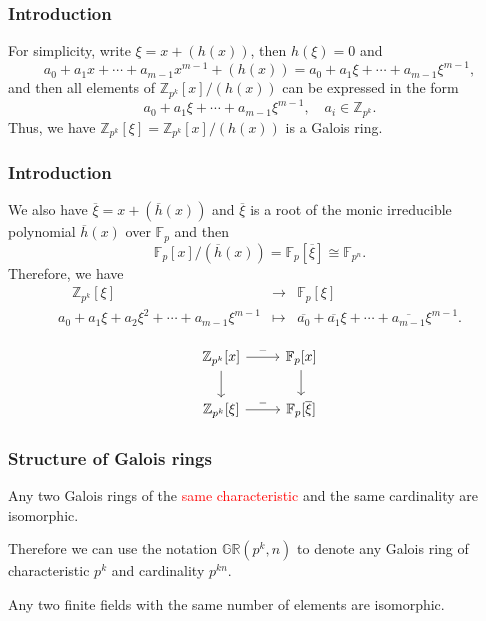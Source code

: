 \documentclass[
    aspectratio=169,                   %
]{beamer}
\newcommand{\Z}{\mathbb{Z}}
\newcommand{\GR}{\mathbb{GR}}
\newcommand{\F}{\mathbb{F}}
\begin{document}
    \begin{frame}
        \frametitle{Introduction}
    
        For simplicity, write $ \xi=x+(h(x)) $, then $ h(\xi)=0 $ and 
        \[a_0+a_1x+\cdots+a_{m-1}x^{m-1}+(h(x))=a_0+a_1\xi+\cdots+a_{m-1}\xi^{m-1},\]
         and then all elements of $ \Z_{p^k}[x]/(h(x)) $ can be expressed in the form
         \[a_0+a_1\xi+\cdots+a_{m-1}\xi^{m-1},\quad a_i\in\Z_{p^k}.\]
        Thus, we have $ \Z_{p^k}[\xi]=\Z_{p^k}[x]/(h(x)) $ is a Galois ring.
    
    \end{frame}

    \begin{frame}[fragile]
        \frametitle{Introduction}
    
        We also have $ \overline{\xi}=x+(\overline{h}(x)) $ and $ \overline{\xi} $ is a root of 
        the monic irreducible polynomial $ \overline{h}(x) $ over $ \F_p $ and then 
        \[\F_p[x]/(\overline{h}(x))=\F_p[\overline{\xi}]\cong \F_{p^n}.\]
        Therefore, we have 
        \[\begin{array}{ccc}
            \quad\Z_{p^k}[\xi] &\rightarrow&\F_{p}[\xi]\\
            a_0+a_1\xi+a_2\xi^2+\cdots+a_{m-1}\xi^{m-1} &\mapsto&\overline{a_0}+\overline{a_1}\xi+\cdots+\overline{a_{m-1}}\xi^{m-1}.
        \end{array}\]
        \begin{center}
            \[\begin{tikzcd}
                \Z_{p^k}[x] \arrow[r,"-"] \arrow[d] & \F_{p}[x] \arrow[d] \\
                \Z_{p^k}[\xi] \arrow[r,"-"]  & \F_{p}[\overline{\xi}] 
            \end{tikzcd}\]
        \end{center}
    \end{frame}
    \begin{frame}
        \frametitle{Structure of Galois rings}
    
        \begin{theorem}
            Any two Galois rings of the \textcolor{red}{same characteristic} and the same cardinality are isomorphic.
        \end{theorem}
        Therefore we can use the notation $ \GR(p^k,n) $ to denote any Galois ring of 
        characteristic $ p^k $ and cardinality $ p^{kn} $.

        \begin{remark}
            Any two finite fields with the same number of elements are isomorphic.
        \end{remark}
    \end{frame}
\end{document}

